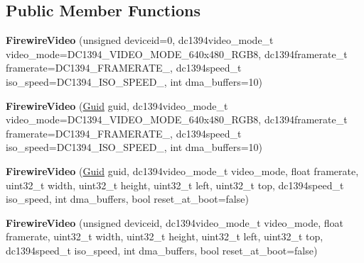 \subsection*{Public Member Functions}
\begin{DoxyCompactItemize}
\item 
{\bfseries Firewire\+Video} (unsigned deviceid=0, dc1394video\+\_\+mode\+\_\+t video\+\_\+mode=D\+C1394\+\_\+\+V\+I\+D\+E\+O\+\_\+\+M\+O\+D\+E\+\_\+640x480\+\_\+\+R\+G\+B8, dc1394framerate\+\_\+t framerate=D\+C1394\+\_\+\+F\+R\+A\+M\+E\+R\+A\+T\+E\+\_, dc1394speed\+\_\+t iso\+\_\+speed=D\+C1394\+\_\+\+I\+S\+O\+\_\+\+S\+P\+E\+E\+D\+\_, int dma\+\_\+buffers=10)\hypertarget{classpangolin_1_1_firewire_video_adb5cdc5120ee7d80560a330497348cac}{}\label{classpangolin_1_1_firewire_video_adb5cdc5120ee7d80560a330497348cac}

\item 
{\bfseries Firewire\+Video} (\hyperlink{structpangolin_1_1_guid}{Guid} guid, dc1394video\+\_\+mode\+\_\+t video\+\_\+mode=D\+C1394\+\_\+\+V\+I\+D\+E\+O\+\_\+\+M\+O\+D\+E\+\_\+640x480\+\_\+\+R\+G\+B8, dc1394framerate\+\_\+t framerate=D\+C1394\+\_\+\+F\+R\+A\+M\+E\+R\+A\+T\+E\+\_, dc1394speed\+\_\+t iso\+\_\+speed=D\+C1394\+\_\+\+I\+S\+O\+\_\+\+S\+P\+E\+E\+D\+\_, int dma\+\_\+buffers=10)\hypertarget{classpangolin_1_1_firewire_video_a067ed2cd36ee9f09360c27eaff14b93f}{}\label{classpangolin_1_1_firewire_video_a067ed2cd36ee9f09360c27eaff14b93f}

\item 
{\bfseries Firewire\+Video} (\hyperlink{structpangolin_1_1_guid}{Guid} guid, dc1394video\+\_\+mode\+\_\+t video\+\_\+mode, float framerate, uint32\+\_\+t width, uint32\+\_\+t height, uint32\+\_\+t left, uint32\+\_\+t top, dc1394speed\+\_\+t iso\+\_\+speed, int dma\+\_\+buffers, bool reset\+\_\+at\+\_\+boot=false)\hypertarget{classpangolin_1_1_firewire_video_a7f7aa96fe8a8540c3ef0b38466d4bc4d}{}\label{classpangolin_1_1_firewire_video_a7f7aa96fe8a8540c3ef0b38466d4bc4d}

\item 
{\bfseries Firewire\+Video} (unsigned deviceid, dc1394video\+\_\+mode\+\_\+t video\+\_\+mode, float framerate, uint32\+\_\+t width, uint32\+\_\+t height, uint32\+\_\+t left, uint32\+\_\+t top, dc1394speed\+\_\+t iso\+\_\+speed, int dma\+\_\+buffers, bool reset\+\_\+at\+\_\+boot=false)\hypertarget{classpangolin_1_1_firewire_video_acf10f2f5ef3562ef67006b2a749f8d71}{}\label{classpangolin_1_1_firewire_video_acf10f2f5ef3562ef67006b2a749f8d71}


\end{DoxyCompactItemize}
